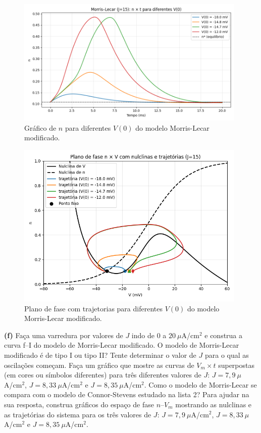 \documentclass[english,11pt,a4paper]{article}
\begin{document}
	\begin{figure}[H]
		\centering
		\includegraphics[width=11cm]{../figures/ex_2b_2.png}
		\caption{Gráfico de $n$ para diferentes $V(0)$ do modelo Morris-Lecar modificado.}
	\end{figure}
	
	\begin{figure}[H]
		\centering
		\includegraphics[width=11cm]{../figures/ex_2b_3.png}
		\caption{Plano de fase com trajetorias para diferentes $V(0)$ do modelo Morris-Lecar modificado.}
	\end{figure}
	
	\noindent\textbf{(f)} Faça uma varredura por valores de $J$ indo de $0$ a $20~\mu$A/cm$^2$ e construa a curva f–I do modelo de Morris-Lecar modificado. O modelo de Morris-Lecar modificado é de tipo I ou tipo II? Tente determinar o valor de $J$ para o qual as oscilações começam. Faça um gráfico que mostre as curvas de $V_m \times t$ superpostas (em cores ou símbolos diferentes) para três diferentes valores de $J$: $J = 7{,}9~\mu$A/cm$^2$, $J = 8{,}33~\mu$A/cm$^2$ e $J = 8{,}35~\mu$A/cm$^2$. Como o modelo de Morris-Lecar se compara com o modelo de Connor-Stevens estudado na lista 2? Para ajudar na sua resposta, construa gráficos do espaço de fase $n$–$V_m$ mostrando as nulclinas e as trajetórias do sistema para os três valores de $J$: $J = 7{,}9~\mu$A/cm$^2$, $J = 8{,}33~\mu$A/cm$^2$ e $J = 8{,}35~\mu$A/cm$^2$.\\
	
\end{document}

